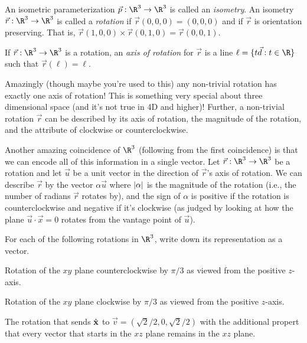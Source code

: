 	\begin{numberlessdefinition}[Rotation]
		An isometric parameterization $\vec p:\R^3\to\R^3$ is called an \emph{isometry}.
		An isometry $\vec r:\R^3\to\R^3$ is called a \emph{rotation} if $\vec r(0,0,0)=(0,0,0)$
		and if $\vec r$ is orientation preserving.  That is, $\vec r(1,0,0)\times \vec r(0,1,0) = \vec r(0,0,1)$.

		If $\vec r:\R^3\to\R^3$ is a rotation, an \emph{axis of rotation} for $\vec r$ is a line
		$\ell = \{t\vec d:t\in\R\}$ such that $\vec r(\ell) = \ell$.
	\end{numberlessdefinition}

	Amazingly (though maybe you're used to this) any non-trivial rotation has exactly one axis of rotation!
	This is something very special about three dimensional space (and it's not true in 4D and higher)!  
	Further, a non-trivial rotation $\vec r$ can be described
	by its axis of rotation, the magnitude of the rotation, and the attribute of clockwise or counterclockwise.

	Another amazing coincidence of $\R^3$ (following from the first coincidence) 
	is that we can encode all of this information in a single vector.
	Let $\vec r:\R^3\to \R^3$ be a rotation and let $\vec u$ be a unit vector in the direction of $\vec r$'s 
	axis of rotation.  We can describe $\vec r$ by the vector $\alpha \vec u$ where $\lvert\alpha\rvert$ is the magnitude
	of the rotation (i.e., the number of radians $\vec r$ rotates by), and the sign of $\alpha$ is positive
	if the rotation is counterclockwise and negative if it's clockwise (as judged by looking at
	how the plane $\vec u\cdot \vec x=0$ rotates from the vantage point of $\vec u$).

\begin{question}
	For each of the following rotations in $\R^3$, write down its representation as a vector.
	\begin{parts}
		\item Rotation of the $xy$ plane counterclockwise by $\pi/3$ as viewed from the positive $z$-axis.
		\item Rotation of the $xy$ plane clockwise by $\pi/3$ as viewed from the positive $z$-axis.
		\item The rotation that sends ${\hat {\mathbf x}}$ to $\vec v=(\sqrt{2}/2, 0, \sqrt{2}/2)$ with the additional
			propert that every vector that starts in the $xz$ plane remains in
			the $xz$ plane.
	\end{parts}
\end{question}


